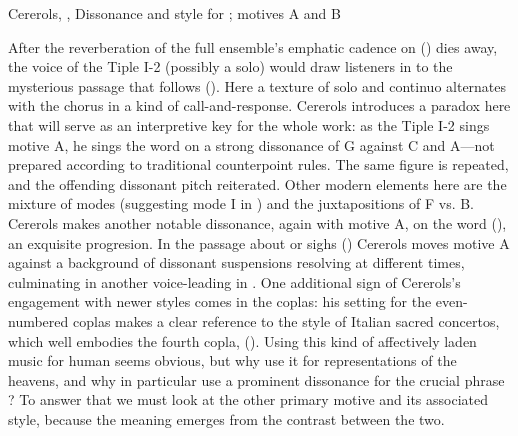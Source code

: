 
{Cererols, , Dissonance and  style for
; motives A and B} 

After the reverberation of the full ensemble's emphatic cadence on
 () dies away, the voice of the Tiple I-2
(possibly a solo) would draw listeners in to the mysterious passage that
follows ().
Here a texture of solo and continuo alternates with the chorus in a kind of
call-and-response.
Cererols introduces a paradox here that will serve as an interpretive key for
the whole work: as the Tiple I-2 sings motive A, he sings the word
 on a strong dissonance of G against C\sh{} and A---not
prepared according to traditional counterpoint rules.
The same figure is repeated, and the offending dissonant pitch reiterated.
Other modern elements here are the mixture of modes (suggesting mode I in
) and the juxtapositions of F\sh{} vs. B\fl{}.
Cererols makes another notable dissonance, again with motive A, on the word
 (), an exquisite
 progresion.
In the passage about  or sighs () Cererols
moves motive A against a background of dissonant suspensions resolving at
different times, culminating in another voice-leading  in
.
One additional sign of Cererols's engagement with newer styles comes in the
coplas: his setting for the even-numbered coplas makes a clear reference to the
style of Italian sacred concertos, which well embodies the fourth copla,
 ().
Using this kind of affectively laden music for human  seems
obvious, but why use it for representations of the heavens, and why in
particular use a prominent dissonance for the crucial phrase ?
To answer that we must look at the other primary motive and its associated
style, because the meaning emerges from the contrast between the two.


